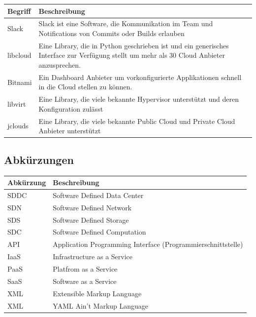 \documentclass[11pt]{scrartcl}
\begin{document}
\begin{tabularx}{\linewidth}{l | X}
    \textbf{Begriff} & \textbf{Beschreibung}\\
    \hline
     Slack &  Slack ist eine Software, die Kommunikation im Team und Notifications von 
     Commits oder Builds erlauben\\
    \hline
    libcloud & Eine Library, die in Python geschrieben ist und ein generisches 
    Interface zur Verfügung stellt um mehr als 30 Cloud Anbieter anzusprechen.\\
    \hline
    Bitnami & Ein Dashboard Anbieter um vorkonfigurierte Applikationen schnell in die Cloud 
    stellen zu können.\\
    \hline
    libvirt & Eine Library, die viele bekannte Hypervisor unterstützt und deren 
    Konfiguration zulässt\\
    \hline
    jclouds & Eine Library, die viele bekannte Public Cloud und Private Cloud Anbieter unterstützt\\
    \hline
\end{tabularx}

\subsection{Abkürzungen}
\begin{tabularx}{\linewidth}{l | X}
    \textbf{Abkürzung} & \textbf{Beschreibung}\\
    \hline
    SDDC & Software Defined Data Center\\
    \hline
    SDN & Software Defined Network\\
    \hline
    SDS & Software Defined Storage\\
    \hline
    SDC & Software Defined Computation\\
    \hline
    API & Application Programming Interface (Programmierschnittstelle)\\
    \hline
    IaaS & Infrastructure as a Service\\
    \hline
    PaaS & Platfrom as a Service\\
    \hline
    SaaS & Software as a Service\\
    \hline
    XML & Extensible Markup Language\\
    \hline
    XML & YAML Ain’t Markup Language\\
\end{tabularx}
\end{document}
